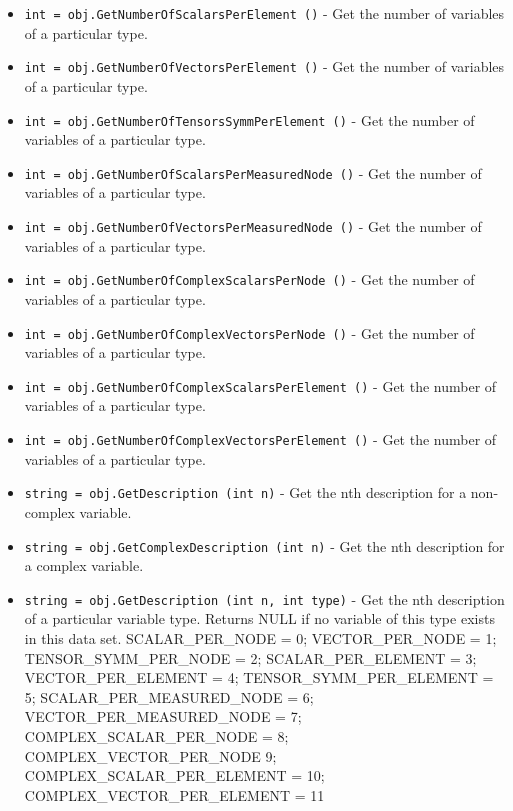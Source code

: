 \begin{itemize}
\item  \verb|int = obj.GetNumberOfScalarsPerElement ()| -  Get the number of variables of a particular type.

\item  \verb|int = obj.GetNumberOfVectorsPerElement ()| -  Get the number of variables of a particular type.

\item  \verb|int = obj.GetNumberOfTensorsSymmPerElement ()| -  Get the number of variables of a particular type.

\item  \verb|int = obj.GetNumberOfScalarsPerMeasuredNode ()| -  Get the number of variables of a particular type.

\item  \verb|int = obj.GetNumberOfVectorsPerMeasuredNode ()| -  Get the number of variables of a particular type.

\item  \verb|int = obj.GetNumberOfComplexScalarsPerNode ()| -  Get the number of variables of a particular type.

\item  \verb|int = obj.GetNumberOfComplexVectorsPerNode ()| -  Get the number of variables of a particular type.

\item  \verb|int = obj.GetNumberOfComplexScalarsPerElement ()| -  Get the number of variables of a particular type.

\item  \verb|int = obj.GetNumberOfComplexVectorsPerElement ()| -  Get the number of variables of a particular type.

\item  \verb|string = obj.GetDescription (int n)| -  Get the nth description for a non-complex variable.

\item  \verb|string = obj.GetComplexDescription (int n)| -  Get the nth description for a complex variable.

\item  \verb|string = obj.GetDescription (int n, int type)| -  Get the nth description of a particular variable type.  Returns NULL if no
 variable of this type exists in this data set.
 SCALAR\_PER\_NODE = 0; VECTOR\_PER\_NODE = 1;
 TENSOR\_SYMM\_PER\_NODE = 2; SCALAR\_PER\_ELEMENT = 3;
 VECTOR\_PER\_ELEMENT = 4; TENSOR\_SYMM\_PER\_ELEMENT = 5;
 SCALAR\_PER\_MEASURED\_NODE = 6; VECTOR\_PER\_MEASURED\_NODE = 7;
 COMPLEX\_SCALAR\_PER\_NODE = 8; COMPLEX\_VECTOR\_PER\_NODE 9;
 COMPLEX\_SCALAR\_PER\_ELEMENT  = 10; COMPLEX\_VECTOR\_PER\_ELEMENT = 11


\end{itemize}
